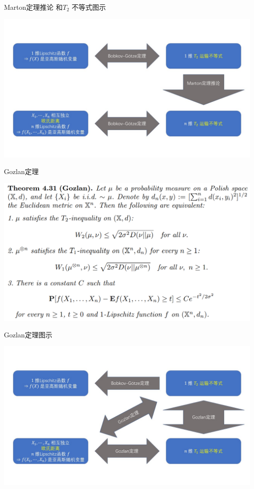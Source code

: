 \documentclass{beamer}
\begin{document}
\begin{frame}{Marton定理推论 和$T_2$ 不等式图示}
\begin{center}
    \includegraphics[width=1.0\textwidth, frame]{figures/structure02.JPG}
\end{center}
\end{frame}

\begin{frame}{Gozlan定理}
\begin{center}
    \includegraphics[width=1.0\textwidth]{figures/4-31-thm.png}
\end{center}
\end{frame}

\begin{frame}{Gozlan定理图示}
\begin{center}
    \includegraphics[width=1.0\textwidth]{figures/structure03.JPG}
\end{center}
\end{frame}
\end{document}
